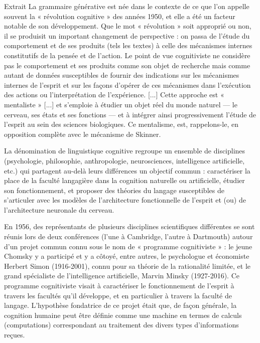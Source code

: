 \begin{lecture}{Extrait}
La grammaire générative est née dans le contexte de ce que l'on appelle souvent la « révolution cognitive » des années 1950, et elle a été un facteur notable de son développement. Que le mot « révolution » soit approprié ou non, il se produisit un important changement de perspective : on passa de l'étude du comportement et de ses produits (tels les textes) à celle des mécanismes internes constitutifs de la pensée et de l'action. Le point de vue cognitiviste ne considère pas le comportement et ses produits comme son objet de recherche mais comme autant de données susceptibles de fournir des indications sur les mécanismes internes de l'esprit et sur les façons d'opérer de ces mécanismes dans l'exécution des actions ou l'interprétation de l'expérience. [...] Cette approche est « mentaliste » [...] et s'emploie à étudier un objet réel du monde naturel — le cerveau, ses états et ses fonctions — et à intégrer ainsi progressivement l'étude de l'esprit au sein des sciences biologiques. Ce mentalisme, est, rappelons-le, en opposition complète avec le mécanisme de Skinner.
\end{lecture}
\par


La dénomination de linguistique cognitive regroupe un ensemble de disciplines (psychologie, philosophie, anthropologie, neurosciences, intelligence artificielle, etc.) qui partagent au-delà leurs différences un objectif commun : caractériser la place de la faculté langagière dans la cognition naturelle ou artificielle, étudier son fonctionnement, et proposer des théories du langage susceptibles de s’articuler avec les modèles de l’architecture fonctionnelle de l’esprit et (ou) de l’architecture neuronale du cerveau.\par

 En 1956, des représentants de plusieurs disciplines scientifiques différentes se sont réunis lors de deux conférences (l’une à Cambridge, l’autre à Dartmouth) autour d’un projet commun connu sous le nom de « programme cognitiviste » : le jeune Chomsky y a participé et y a côtoyé, entre autres, le psychologue et économiste Herbert Simon (1916-2001), connu pour sa théorie de la rationalité limitée, et le grand spécialiste de l’intelligence artificielle, Marvin Minsky (1927-2016). Ce programme cognitiviste visait à caractériser le fonctionnement de l’esprit à travers les facultés qu’il développe, et en particulier à travers la faculté de langage. L'hypothèse fondatrice de ce projet était que, de façon générale, la cognition humaine peut être définie comme une machine en termes de calculs (computations) correspondant au traitement des divers types d’informations reçues.\par

